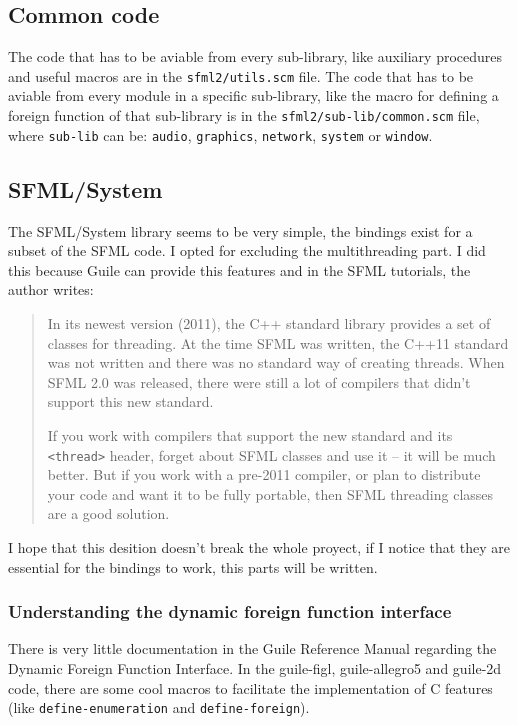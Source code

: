 \documentclass[latterpaper, leqno]{article}
\begin{document}
\subsection*{Common code}
The code that has to be aviable from every sub-library, like auxiliary procedures and useful macros are in the \texttt{sfml2/utils.scm} file. The code that has to be aviable from every module in a specific sub-library, like the macro for defining a foreign function of that sub-library is in the \texttt{sfml2/sub-lib/common.scm} file, where \texttt{sub-lib} can be: \texttt{audio}, \texttt{graphics}, \texttt{network}, \texttt{system} or \texttt{window}.

\subsection{SFML/System}
The SFML/System library seems to be very simple, the bindings exist for a subset of the SFML code. I opted for excluding the multithreading part. I did this because Guile can provide this features and in the SFML tutorials, the author writes:

\begin{quotation}
 In its newest version (2011), the C++ standard library provides a set of classes for threading. At the time SFML was written, the C++11 standard was not written and there was no standard way of creating threads. When SFML 2.0 was released, there were still a lot of compilers that didn't support this new standard.

If you work with compilers that support the new standard and its \texttt{<thread>} header, forget about SFML classes and use it -- it will be much better. But if you work with a pre-2011 compiler, or plan to distribute your code and want it to be fully portable, then SFML threading classes are a good solution. 
\end{quotation}

I hope that this desition doesn't break the whole proyect, if I notice that they are essential for the bindings to work, this parts will be written.

\subsubsection*{Understanding the dynamic foreign function interface}
There is very little documentation in the Guile Reference Manual regarding the Dynamic Foreign Function Interface. In the guile-figl, guile-allegro5 and guile-2d code, there are some cool macros to facilitate the implementation of C features (like \texttt{define-enumeration} and \texttt{define-foreign}).
\end{document}
